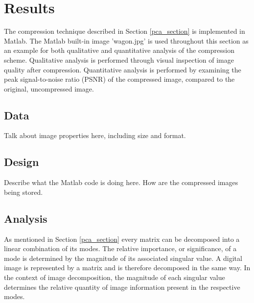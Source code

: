 \documentclass[conference]{IEEEtran}
\begin{document}
    	

    \section{Results}

    The compression technique described in Section \ref{pca_section} is implemented in Matlab. The Matlab built-in image 'wagon.jpg' is used throughout this section as an example for both qualitative and quantitative analysis of the compression scheme. Qualitative analysis is performed through visual inspection of image quality after compression. Quantitative analysis is performed by examining the peak signal-to-noise ratio (PSNR) of the compressed image, compared to the original, uncompressed image.

    \subsection{Data}
    Talk about image properties here, including size and format.

    \subsection{Design}
    Describe what the Matlab code is doing here.
    How are the compressed images being stored.

    \subsection{Analysis}
    As mentioned in Section \ref{pca_section} every matrix can be decomposed into a linear combination of its modes. The relative importance, or significance, of a mode is determined by the magnitude of its associated singular value. A digital image is represented by a matrix and is therefore decomposed in the same way. In the context of image decomposition, the magnitude of each singular value determines the relative quantity of image information present in the respective modes.
\end{document}
